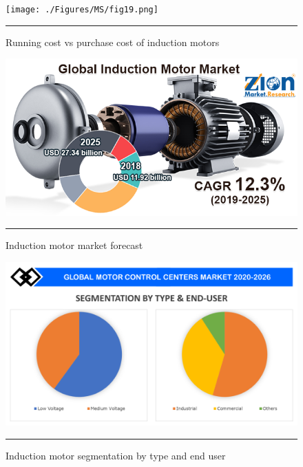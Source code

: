 \begin{figure}[htbp]
  \centering
    \texttt{[image: ./Figures/MS/fig19.png]}
    \rule{35em}{1.2pt}
  \caption{Running cost vs purchase cost of induction motors}
  \label{fig:Running cost vs purchase cost of induction motors}
\end{figure}
\begin{figure}[htbp]
  \centering
    \includegraphics[width = 5in]{./Figures/MS/fig20.png}
    \rule{35em}{1.2pt}
  \caption{Induction motor market forecast}
  \label{fig:Induction motor market forecast}
\end{figure}
\begin{figure}[htbp]
  \centering
    \includegraphics[width = 5in]{./Figures/MS/fig18.png}
    \rule{35em}{1.2pt}
  \caption{Induction motor segmentation by type and end user}
  \label{fig:Induction motor segmentation by type and end user}
\end{figure}

